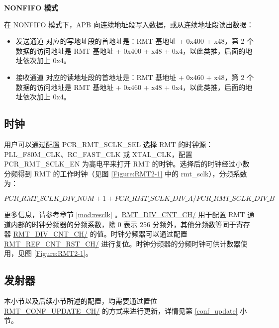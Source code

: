 \documentclass[main\_\_CN.tex]{subfiles}
\begin{document}
\textbf{NONFIFO 模式}

在 NONFIFO 模式下，APB 向连续地址段写入数据，或从连续地址段读出数据：
\begin{itemize}
    \item 发送通道  对应的写地址段的首地址是：RMT 基地址 + 0x400 + x48，第 2 个数据的访问地址是 RMT 基地址 + 0x400 + x48 + 0x4，以此类推，后面的地址依次加上 0x4。
    \item 接收通道  对应的读地址段的首地址是：RMT 基地址 + 0x460 + x48，第 2 个数据的访问地址是 RMT 基地址 + 0x460 + x48 + 0x4，以此类推，后面的地址依次加上 0x4。
\end{itemize}



\subsection{时钟}\label{clock}
用户可以通过配置 PCR\_RMT\_SCLK\_SEL 选择 RMT 的时钟源：PLL\_F80M\_CLK、RC\_FAST\_CLK 或 XTAL\_CLK，配置 PCR\_RMT\_SCLK\_EN 为高电平来打开 RMT 的时钟。选择后的时钟经过小数分频得到 RMT 的工作时钟（见图 \ref{Figure:RMT2-1} 中的 rmt\_sclk），分频系数为：

$$
PCR\_RMT\_SCLK\_DIV\_NUM + 1 + PCR\_RMT\_SCLK\_DIV\_A/PCR\_RMT\_SCLK\_DIV\_B
$$

更多信息，请参考章节 \ref{mod:resclk} \textit{}。\hyperref[fielddesc:RMTDIVCNTCHN]{RMT\_DIV\_CNT\_CH/} 用于配置 RMT 通道内部的时钟分频器的分频系数，除 0 表示 256 分频外，其他分频数等同于寄存器 \hyperref[fielddesc:RMTDIVCNTCHN]{RMT\_DIV\_CNT\_CH/} 的值。时钟分频器可以通过配置 \hyperref[fielddesc:RMTREFCNTRSTCHN]{RMT\_REF\_CNT\_RST\_CH/} 进行复位。时钟分频器的分频时钟可供计数器使用，见图 \ref{Figure:RMT2-1}。

\subsection{发射器}
\vspace{0.4cm}

\begin{tiplisting}
本小节以及后续小节所述的配置，均需要通过置位 \hyperref[fielddesc:RMTCONFUPDATECHN]{RMT\_CONF\_UPDATE\_CH/} 的方式来进行更新，详情见第 \ref{conf_update} 小节。
\end{tiplisting}
\end{document}
